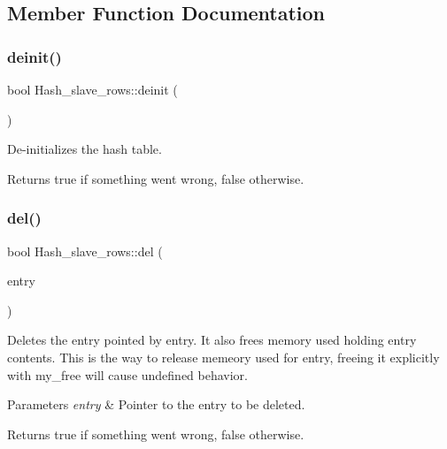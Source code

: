 \subsection{Member Function Documentation}
\mbox{\label{classHash__slave__rows_a7281d442d80a5cb30e62d79c08d023d9}} 
\subsubsection{\texorpdfstring{deinit()}{deinit()}}
{\footnotesize\ttfamily bool Hash\+\_\+slave\+\_\+rows\+::deinit (\begin{DoxyParamCaption}\item[{void}]{ }\end{DoxyParamCaption})}

De-\/initializes the hash table.

\begin{DoxyReturn}{Returns}
true if something went wrong, false otherwise. 
\end{DoxyReturn}
\mbox{\label{classHash__slave__rows_a2b17b1ca10fc73c3d3865b8abca67219}} 
\subsubsection{\texorpdfstring{del()}{del()}}
{\footnotesize\ttfamily bool Hash\+\_\+slave\+\_\+rows\+::del (\begin{DoxyParamCaption}\item[{\mbox{\hyperlink{structhash__row__entry__st}{H\+A\+S\+H\+\_\+\+R\+O\+W\+\_\+\+E\+N\+T\+RY}} $\ast$}]{entry }\end{DoxyParamCaption})}

Deletes the entry pointed by entry. It also frees memory used holding entry contents. This is the way to release memeory used for entry, freeing it explicitly with my\+\_\+free will cause undefined behavior.


\begin{DoxyParams}{Parameters}
{\em entry} & Pointer to the entry to be deleted. \\
\hline
\end{DoxyParams}
\begin{DoxyReturn}{Returns}
true if something went wrong, false otherwise. 
\end{DoxyReturn}
\mbox{\label{classHash__slave__rows_a3f341c89bba321288653e82ea6bfe509}} 
